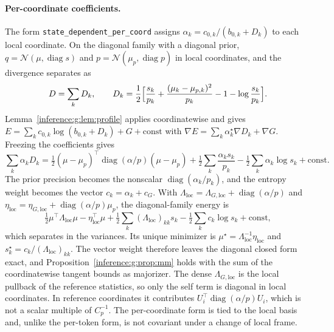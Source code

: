 \documentclass[11pt]{article}
\theoremstyle{definition}
\theoremstyle{remark}
\providecommand{\cfg}[1]{{\small\texttt{#1}}}
\providecommand{\diag}{\operatorname{diag}}
\providecommand{\N}{\mathcal{N}}
\begin{document}
\paragraph{Per-coordinate coefficients.}
The form \cfg{state\_dependent\_per\_coord} assigns $\alpha_k=c_{0,k}/(b_{0,k}+D_k)$ to each local coordinate. On the diagonal family with a diagonal prior, $q=\N(\mu,\diag s)$ and $p=\N(\mu_p,\diag p)$ in local coordinates, and the divergence separates as
\begin{equation}
D=\sum_kD_k,\qquad D_k=\frac12\Bigl[\frac{s_k}{p_k}+\frac{(\mu_k-\mu_{p,k})^2}{p_k}-1-\log\frac{s_k}{p_k}\Bigr].
\end{equation}
Lemma~\ref{inference:g:lem:profile} applies coordinatewise and gives $E=\sum_kc_{0,k}\log(b_{0,k}+D_k)+G+\text{const}$ with $\nabla E=\sum_k\alpha_k^\star\nabla D_k+\nabla G$. Freezing the coefficients gives
\begin{equation}
\sum_k\alpha_kD_k=\tfrac12(\mu-\mu_p)^\top\diag(\alpha/p)(\mu-\mu_p)+\tfrac12\sum_k\frac{\alpha_ks_k}{p_k}-\tfrac12\sum_k\alpha_k\log s_k+\text{const}.
\end{equation}
The prior precision becomes the nonscalar $\diag(\alpha_k/p_k)$, and the entropy weight becomes the vector $c_k=\alpha_k+c_G$. With $\Lambda_{\mathrm{loc}}=\Lambda_{G,\mathrm{loc}}+\diag(\alpha/p)$ and $\eta_{\mathrm{loc}}=\eta_{G,\mathrm{loc}}+\diag(\alpha/p)\mu_p$, the diagonal-family energy is
\begin{equation}
\tfrac12\mu^\top\Lambda_{\mathrm{loc}}\mu-\eta_{\mathrm{loc}}^\top\mu+\tfrac12\sum_k(\Lambda_{\mathrm{loc}})_{kk}s_k-\tfrac12\sum_kc_k\log s_k+\text{const},
\end{equation}
which separates in the variances. Its unique minimizer is $\mu^\star=\Lambda_{\mathrm{loc}}^{-1}\eta_{\mathrm{loc}}$ and $s_k^\star=c_k/(\Lambda_{\mathrm{loc}})_{kk}$. The vector weight therefore leaves the diagonal closed form exact, and Proposition~\ref{inference:g:prop:mm} holds with the sum of the coordinatewise tangent bounds as majorizer. The dense $\Lambda_{G,\mathrm{loc}}$ is the local pullback of the reference statistics, so only the self term is diagonal in local coordinates. In reference coordinates it contributes $U_i^\top\diag(\alpha/p)U_i$, which is not a scalar multiple of $C_p^{-1}$. The per-coordinate form is tied to the local basis and, unlike the per-token form, is not covariant under a change of local frame.
\end{document}
